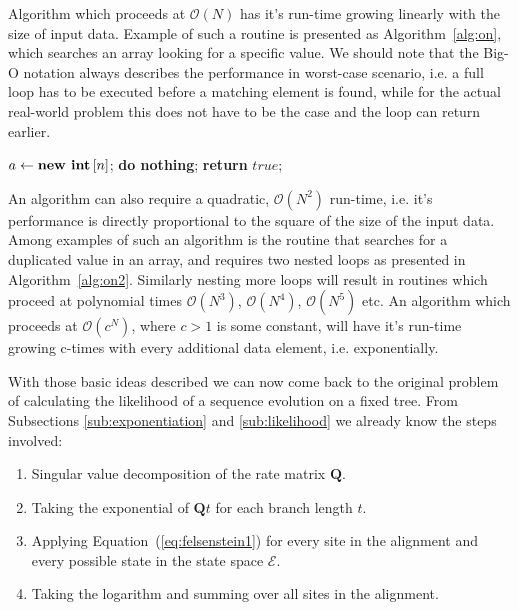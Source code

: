 Algorithm which proceeds at $\mathcal{O}\left(N\right)$ has it's run-time growing linearly with the size of input data.
Example of such a routine is presented as Algorithm~\ref{alg:on}, which searches an array looking for a specific value.
We should note that the Big-O notation always describes the performance in worst-case scenario, i.e. a full loop has to be executed before a matching element is found, while for the actual real-world problem this does not have to be the case and the loop can return earlier.

\begin{algorithm}[H]
\centering
\begin{algorithmic}[1]
\State $a \gets \text{\textbf{new int}}\left[n\right]$;
%
%
%
%
\State \textbf{do nothing};
%
\Else 
%
%
\State \textbf{return} $true$;
%
\EndIf
%
\EndIf {}
%
\EndFor {}
%
\EndFor {}
\end{algorithmic}
\caption{
{ \footnotesize 
{\bf Search for a first duplicated value.} 
}%
}
\label{alg:on2}
\end{algorithm}

An algorithm can also require a quadratic, $\mathcal{O}\left(N^2\right)$ run-time, i.e. it's performance is directly proportional to the square of the size of the input data.
Among examples of such an algorithm is the routine that searches for a duplicated value in an array, and requires two nested loops as presented in Algorithm~\ref{alg:on2}.
Similarly nesting more loops will result in routines which proceed at polynomial times $\mathcal{O}\left(N^3\right)$, $\mathcal{O}\left(N^4\right)$, $\mathcal{O}\left(N^5\right)$ etc.
An algorithm which proceeds at $\mathcal{O}\left(c^N\right)$, where $c>1$ is some constant, will have it's run-time growing c-times with every additional data element, i.e. exponentially. 

With those basic ideas described we can now come back to the original problem of calculating the likelihood of a sequence evolution on a fixed tree.
From Subsections \ref{sub:exponentiation} and \ref{sub:likelihood} we already know the steps involved:

\begin{enumerate}
\item { Singular value decomposition of the rate matrix $\mathbf{Q}$. }
\item { Taking the exponential of $\mathbf{Q}t$ for each branch length $t$. }
\item { Applying Equation~(\ref{eq:felsenstein1}) for every site in the alignment and every possible state in the state space $\mathcal{E}$. }
\item { Taking the logarithm and summing over all sites in the alignment. }
\end{enumerate}

